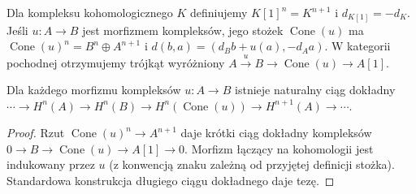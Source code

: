 \begin{definicja}
Dla kompleksu kohomologicznego $K$ definiujemy $K[1]^n=K^{n+1}$
i $d_{K[1]}=-d_K$. Jeśli $u:A\to B$ jest morfizmem kompleksów,
jego stożek $\operatorname{Cone}(u)$ ma
$\operatorname{Cone}(u)^n=B^n\oplus A^{n+1}$ i
$d(b,a)=(d_Bb+u(a),-d_Aa)$. W kategorii pochodnej otrzymujemy
trójkąt wyróżniony
$A\xrightarrow{u}B\to\operatorname{Cone}(u)\to A[1]$.
\end{definicja}
\begin{lemat}
Dla każdego morfizmu kompleksów $u:A\to B$ istnieje naturalny
ciąg dokładny
$\cdots\to H^n(A)\to H^n(B)\to
H^n(\operatorname{Cone}(u))\to H^{n+1}(A)\to\cdots$.
\end{lemat}
\begin{proof}
Rzut $\operatorname{Cone}(u)^n\to A^{n+1}$ daje krótki ciąg
dokładny kompleksów $0\to B\to\operatorname{Cone}(u)\to A[1]\to0$.
Morfizm łączący na kohomologii jest indukowany przez $u$ (z
konwencją znaku zależną od przyjętej definicji stożka). Standardowa
konstrukcja długiego ciągu dokładnego daje tezę.
\end{proof}

